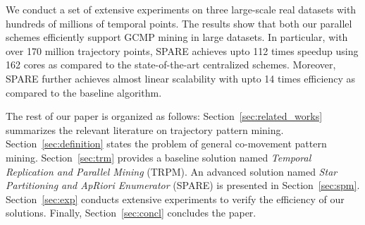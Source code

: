 We conduct a set of extensive experiments on three large-scale real datasets with hundreds of millions of
temporal points. 
The results show that both our parallel schemes efficiently support GCMP mining in large datasets.
In particular, with over 170 million trajectory points,
SPARE achieves upto 112 times speedup using 162 cores as compared to the state-of-the-art centralized schemes.
Moreover, SPARE further achieves almost linear scalability with upto 14 times efficiency
as compared to the baseline algorithm.

The rest of our paper is organized as follows: Section~\ref{sec:related_works} summarizes the relevant literature on 
trajectory pattern mining. Section~\ref{sec:definition} states the problem of general co-movement pattern mining. Section~\ref{sec:trm} provides a baseline solution named \emph{Temporal Replication and Parallel Mining} (TRPM). An advanced solution named
\emph{Star Partitioning and ApRiori Enumerator} (SPARE) is presented in Section~\ref{sec:spm}. Section~\ref{sec:exp} conducts extensive experiments to verify the efficiency of our solutions. Finally, Section~\ref{sec:concl} concludes the paper.
